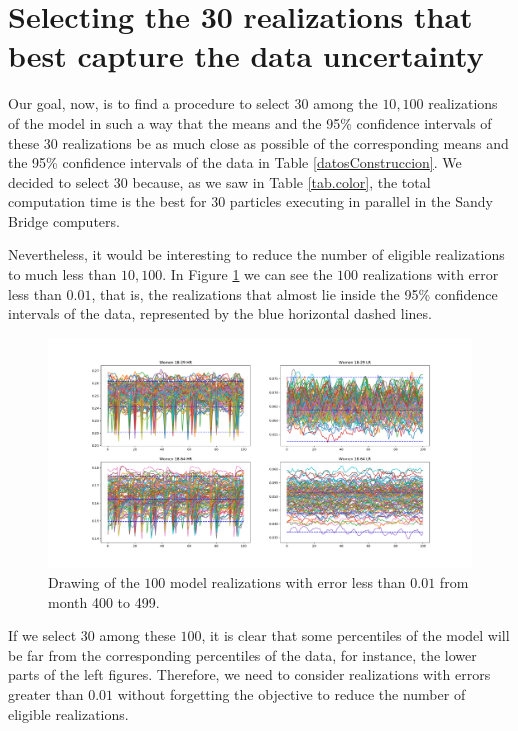\section{Selecting the 30 realizations that best capture the data uncertainty}
Our goal, now, is to find a procedure to select $30$ among the $10,100$ realizations of the model in such a way that the means and the 95\% confidence intervals of these $30$ realizations be as much close as possible of the corresponding means and the 95\% confidence intervals of the data in Table \ref{datosConstruccion}. We decided to select $30$ because, as we saw in Table \ref{tab.color}, the total computation time is the best for $30$ particles executing in parallel in the Sandy Bridge computers.

Nevertheless, it would be interesting to reduce the number of eligible realizations to much less than $10,100$. In Figure \ref{Error_0} we can see the $100$ realizations with error less than $0.01$, that is, the realizations that almost lie inside the 95\% confidence intervals of the data, represented by the blue horizontal dashed lines. 

\begin{figure}[h!]
	\centering
	\includegraphics[width=\linewidth]{IMGs/1.-Calibrado/Error_001.pdf}
	\caption{Drawing of the $100$ model realizations with error less than $0.01$ from month 400 to 499. }
	\label{Error_0}
\end{figure}

If we select $30$ among these $100$, it is clear that some percentiles of the model will be far from the corresponding percentiles of the data, for instance, the lower parts of the left figures. Therefore, we need to consider realizations with errors greater than $0.01$ without forgetting the objective to reduce the number of eligible realizations.  

